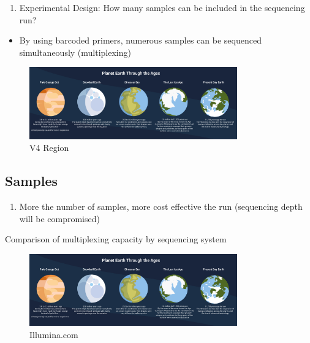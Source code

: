 \documentclass[
]{book}
\providecommand{\tightlist}{%
  \setlength{\itemsep}{0pt}\setlength{\parskip}{0pt}}
\begin{document}
\begin{enumerate}
\def\labelenumi{\arabic{enumi}.}
\tightlist
\item
  Experimental Design: How many samples can be included in the sequencing run?
\end{enumerate}

\begin{itemize}
\tightlist
\item
  By using barcoded primers, numerous samples can be sequenced simultaneously (multiplexing)
\end{itemize}

\begin{figure}
\centering
\includegraphics[width=0.8\textwidth,height=\textheight]{./Figures/Planets.png}
\caption{V4 Region}
\end{figure}

\hypertarget{samples}{%
\subsection{Samples}\label{samples}}

\begin{enumerate}
\def\labelenumi{\arabic{enumi}.}
\tightlist
\item
  More the number of samples, more cost effective the run (sequencing depth will be compromised)
\end{enumerate}

Comparison of multiplexing capacity by sequencing system

\begin{figure}
\centering
\includegraphics[width=0.8\textwidth,height=\textheight]{./Figures/Planets.png}
\caption{Illumina.com}
\end{figure}
\end{document}

